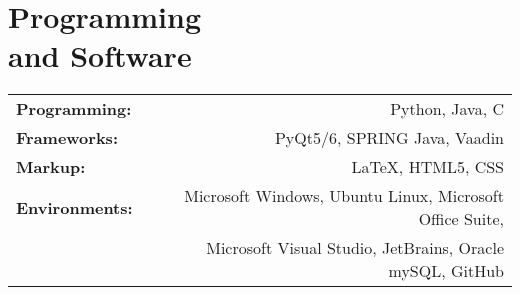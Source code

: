 \section{\sc Programming\\ and Software}
\begin{tabular}{lr}
	\textbf{Programming:} & Python, Java, C\\
	\textbf{Frameworks:} & PyQt5/6, SPRING Java, Vaadin\\
	\textbf{Markup:} & \LaTeX, HTML5, CSS\\
	\textbf{Environments:} & Microsoft Windows, Ubuntu Linux, Microsoft Office Suite,\\
	& Microsoft Visual Studio, JetBrains, Oracle mySQL, GitHub
\end{tabular}